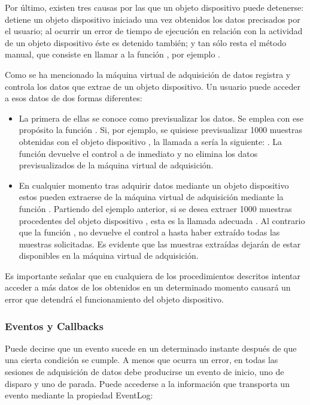 Por último, existen tres causas por las que un objeto dispositivo puede
detenerse: \matlab{} detiene un objeto dispositivo iniciado una vez
obtenidos los datos precisados por el usuario; al ocurrir un error de
tiempo de ejecución en relación con la actividad de un objeto dispositivo
éste es detenido también; y tan sólo resta el método manual, que consiste
en llamar a la función , por ejemplo .

Como se ha mencionado la máquina virtual de adquisición de datos registra y
controla los datos que extrae de un objeto dispositivo. Un usuario puede
acceder a esos datos de dos formas diferentes:

\begin{itemize}
	\item La primera de ellas se conoce como previsualizar los datos.
		Se emplea con ese propósito la función . Si,
		por ejemplo, se quisiese previsualizar 1000 muestras
		obtenidas con el objeto dispositivo , la
		llamada a  sería la siguiente: . La función 
		devuelve el control a \matlab{} de inmediato y no elimina
		los datos previsualizados de la máquina virtual de
		adquisición.
	\item En cualquier momento tras adquirir datos mediante un objeto
		dispositivo estos pueden extraerse de la máquina virtual de
		adquisición mediante la función . Partiendo
		del ejemplo anterior, si se desea extraer 1000 muestras
		procedentes del objeto dispositivo , esta es
		la llamada adecuada . Al
		contrario que la función ,  no
		devuelve el control a \matlab{} hasta haber extraído todas
		las muestras solicitadas. Es evidente que las muestras
		extraídas dejarán de estar disponibles en la máquina
		virtual de adquisición.
\end{itemize}

Es importante señalar que en cualquiera de los procedimientos descritos
intentar acceder a más datos de los obtenidos en un determinado momento
causará un error que detendrá el funcionamiento del objeto dispositivo.


\subsubsection{Eventos y Callbacks}

Puede decirse que un evento sucede en un determinado instante después de
que una cierta condición se cumple. A menos que ocurra un error, en todas
las sesiones de adquisición de datos debe producirse un evento de inicio,
uno de disparo y uno de parada. Puede accederse a la información que
transporta un evento mediante la propiedad \textsf{EventLog}:

